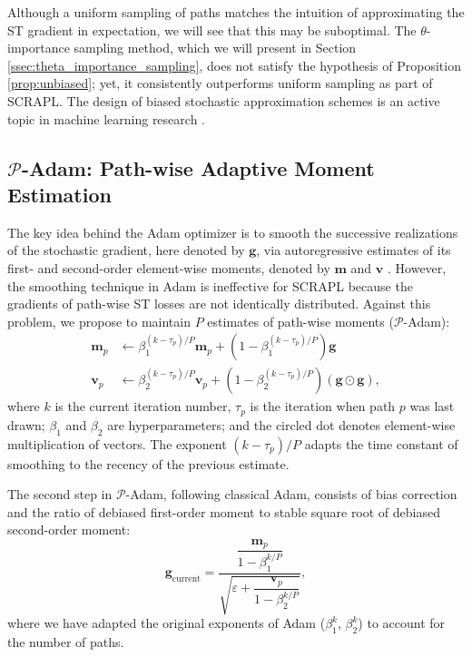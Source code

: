 \documentclass{article} %
\theoremstyle{plain}
\theoremstyle{definition}
\theoremstyle{remark}
\begin{document}
\vspace{-15pt}
Although a uniform sampling of paths matches the intuition of approximating the ST gradient in expectation, we will see that this may be suboptimal.
The $\theta$-importance sampling method, which we will present in Section \ref{ssec:theta_importance_sampling}, does not satisfy the hypothesis of Proposition \ref{prop:unbiased}; yet, it consistently outperforms uniform sampling as part of SCRAPL.
The design of biased stochastic approximation schemes is an active topic in machine learning research \citep{dieuleveut2023stochastic}.


\subsection{$\mathcal{P}$-Adam: Path-wise Adaptive Moment Estimation}
\label{ssec:p-adam}
The key idea behind the Adam optimizer is to smooth the successive realizations of the stochastic gradient, here denoted by $\boldsymbol{g}$, via autoregressive estimates of its first- and second-order element-wise moments, denoted by $\boldsymbol{m}$ and $\boldsymbol{v}$ \citep{kingma2014adam}.
However, the smoothing technique in Adam is ineffective for SCRAPL because the gradients of path-wise ST losses are not identically distributed.
Against this problem, we propose to maintain $P$ estimates of path-wise moments ($\mathcal{P}$-Adam):
\begin{align}
\boldsymbol{m}_p &\leftarrow \beta_1^{(k-\tau_p)/P} \boldsymbol{m}_p + (1 - \beta_{1}^{(k-\tau_p)/P}) \boldsymbol{g}\\
\boldsymbol{v}_p &\leftarrow \beta_2^{(k-\tau_p)/P} \boldsymbol{v}_p + (1 - \beta_{2}^{(k-\tau_p)/P}) (\boldsymbol{g} \odot \boldsymbol{g}),
\end{align}
where $k$ is the current iteration number, $\tau_p$ is the iteration when path $p$ was last drawn; $\beta_1$ and $\beta_2$ are hyperparameters; and the circled dot denotes element-wise multiplication of vectors.
The exponent $(k-\tau_p)/P$ adapts the time constant of smoothing to the recency of the previous estimate.

The second step in $\mathcal{P}$-Adam, following classical Adam, consists of bias correction and the ratio of debiased first-order moment to stable square root of debiased second-order moment:
\begin{equation}
\boldsymbol{g}_{\mathrm{current}} =
\dfrac{\dfrac{\boldsymbol{m}_p}{1-\beta_1^{k/P}}}{\sqrt{\varepsilon+\dfrac{\boldsymbol{v}_p}{1-\beta_2^{k/P}}}},
\end{equation}
where we have adapted the original exponents of Adam ($\beta_1^{k}$, $\beta_2^{k}$) to account for the number of paths.
\end{document}
